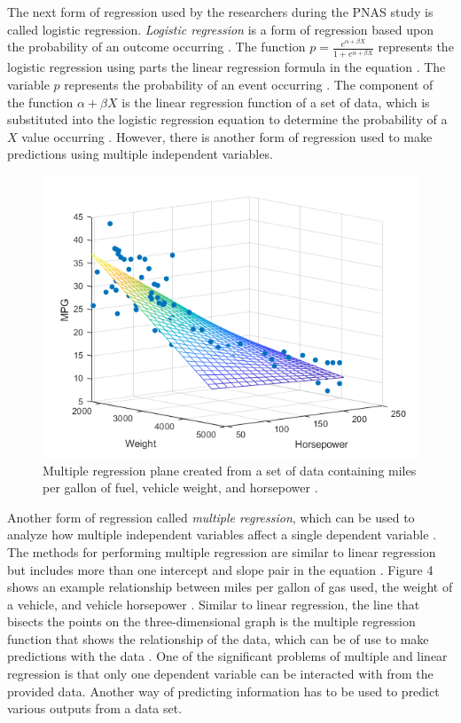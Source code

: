 \documentclass[a4paper, 12pt]{article}
\begin{document}
\begin{paragraph}
\par
\indent The next form of regression used by the researchers during the PNAS study is called logistic regression. \textit{Logistic regression} is a form of regression based upon the probability of an outcome occurring \cite{PrinDS}. The function $p=\frac{e^{\alpha+\beta X}}{1+e^{\alpha+\beta X}}$ represents the logistic regression using parts the linear regression formula in the equation \cite{PrinDS}. The variable $p$ represents the probability of an event occurring \cite{PrinDS}. The component of the function $\alpha+\beta X$ is the linear regression function of a set of data, which is substituted into the logistic regression equation to determine the probability of a $X$ value occurring \cite{PrinDS}. However, there is another form of regression used to make predictions using multiple independent variables.
\par

\begin{figure}[h]
\centering
\includegraphics[scale=0.80]{MultiReg}
\caption{Multiple regression plane created from a set of data containing miles per gallon of fuel, vehicle weight, and horsepower \cite{MultiPNG}.}
\end{figure}

\indent Another form of regression called \textit{multiple regression}, which can be used to analyze how multiple independent variables affect a single dependent variable \cite{Stats2015}. The methods for performing multiple regression are similar to linear regression but includes more than one intercept and slope pair in the equation \cite{Stats2015}. Figure 4 shows an example relationship between miles per gallon of gas used, the weight of a vehicle, and vehicle horsepower \cite{MultiPNG}. Similar to linear regression, the line that bisects the points on the three-dimensional graph is the multiple regression function that shows the relationship of the data, which can be of use to make predictions with the data \cite{Stats2015}. One of the significant problems of multiple and linear regression is that only one dependent variable can be interacted with from the provided data. Another way of predicting information has to be used to predict various outputs from a data set.

\end{paragraph}
\end{document}
